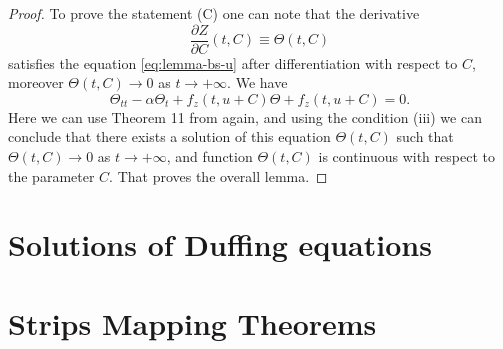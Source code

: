 \begin{proof}
	To prove the statement (C) one can note that the derivative
	\begin{equation}
		\dfrac{\partial Z}{\partial C}(t, C) \equiv \Theta(t, C)
	\end{equation}
	satisfies the equation \eqref{eq:lemma-bs-u} after differentiation with respect to $C$, moreover $\Theta(t, C) \to 0$ as $t \to +\infty$.
	We have
	\begin{equation}
		\Theta_{tt} - \alpha \Theta_t + f_z(t, u + C) \Theta + f_z(t, u + C) = 0.
	\end{equation}
	Here we can use Theorem 11 from \cite[Chapter 3]{Coppel} again, and using the condition (iii) we can conclude that there exists a solution of this equation $\Theta(t, C)$ such that $\Theta(t, C) \to 0$ as $t \to +\infty$, and function $\Theta(t, C)$ is continuous with respect to the parameter $C$.
	That proves the overall lemma.
\end{proof}

\chapter{Solutions of Duffing equations}
\label{appendix:solutions-of-duffing-equations}

\chapter{Strips Mapping Theorems}
\label{appendix:strips-mapping-theorems}

